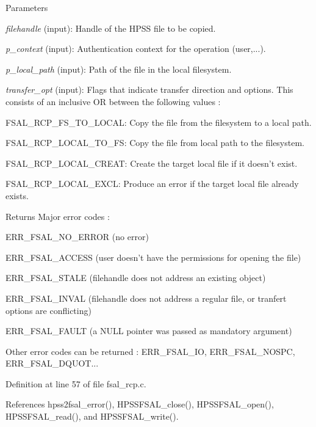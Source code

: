 \begin{DoxyParams}{Parameters}
\item[{\em filehandle}](input): Handle of the HPSS file to be copied. \item[{\em p\_\-context}](input): Authentication context for the operation (user,...). \item[{\em p\_\-local\_\-path}](input): Path of the file in the local filesystem. \item[{\em transfer\_\-opt}](input): Flags that indicate transfer direction and options. This consists of an inclusive OR between the following values :
\begin{DoxyItemize}
\item FSAL\_\-RCP\_\-FS\_\-TO\_\-LOCAL: Copy the file from the filesystem to a local path.
\item FSAL\_\-RCP\_\-LOCAL\_\-TO\_\-FS: Copy the file from local path to the filesystem.
\item FSAL\_\-RCP\_\-LOCAL\_\-CREAT: Create the target local file if it doesn't exist.
\item FSAL\_\-RCP\_\-LOCAL\_\-EXCL: Produce an error if the target local file already exists.
\end{DoxyItemize}\end{DoxyParams}
\begin{DoxyReturn}{Returns}
Major error codes :
\begin{DoxyItemize}
\item ERR\_\-FSAL\_\-NO\_\-ERROR (no error)
\item ERR\_\-FSAL\_\-ACCESS (user doesn't have the permissions for opening the file)
\item ERR\_\-FSAL\_\-STALE (filehandle does not address an existing object)
\item ERR\_\-FSAL\_\-INVAL (filehandle does not address a regular file, or tranfert options are conflicting)
\item ERR\_\-FSAL\_\-FAULT (a NULL pointer was passed as mandatory argument)
\item Other error codes can be returned : ERR\_\-FSAL\_\-IO, ERR\_\-FSAL\_\-NOSPC, ERR\_\-FSAL\_\-DQUOT... 
\end{DoxyItemize}
\end{DoxyReturn}


Definition at line 57 of file fsal\_\-rcp.c.

References hpss2fsal\_\-error(), HPSSFSAL\_\-close(), HPSSFSAL\_\-open(), HPSSFSAL\_\-read(), and HPSSFSAL\_\-write().